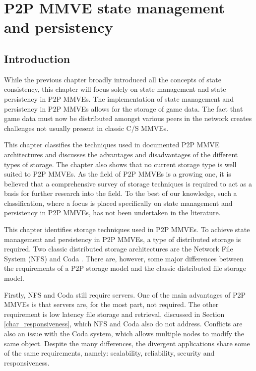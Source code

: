 \chapter{P2P MMVE state management and persistency}
\label{p2p_MMVE_state_persistency}

\section{Introduction}

While the previous chapter broadly introduced all the concepts of state consistency, this chapter will focus solely on state management and state persistency in P2P MMVEs. The implementation of state management and persistency in P2P MMVEs allows for the storage of game data. The fact that game data must now be distributed amongst various peers in the network creates challenges not usually present in classic C/S MMVEs.

This chapter classifies the techniques used in documented P2P MMVE architectures and discusses the advantages and disadvantages of the different types of storage. The chapter also shows that no current storage type is well suited to P2P MMVEs. As the field of P2P MMVEs is a growing one, it is believed that a comprehensive survey of storage techniques is required to act as a basis for further research into the field. To the best of our knowledge, such a classification, where a focus is placed specifically on state management and persistency in P2P MMVEs, has not been undertaken in the literature.

This chapter identifies storage techniques used in P2P MMVEs. To achieve state management and persistency in P2P MMVEs, a type of distributed storage is required. Two classic distributed storage architectures are the Network File System (NFS) \cite{NFS4_protocol} and Coda  \cite{Kistler_Coda_disconnected}. There are, however, some major differences between the requirements of a P2P storage model and the classic distributed file storage model.

Firstly, NFS and Coda still require servers. One of the main advantages of P2P MMVEs is that servers are, for the most part, not required. The other requirement is low latency file storage and retrieval, discussed in Section \ref{char_responsiveness}, which NFS and Coda also do not address. Conflicts are also an issue with the Coda system, which allows multiple nodes to modify the same object. Despite the many differences, the divergent applications share some of the same requirements, namely: scalability, reliability, security and responsiveness.

